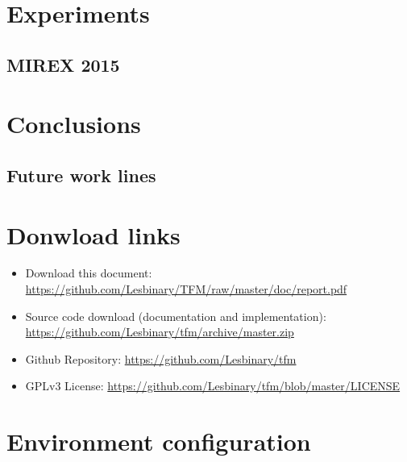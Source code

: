 \documentclass[a4paper,openany,oneside,12pt]{book}
\begin{document}
\chapter{Experiments}\label{experiments}

\section{MIREX 2015}

\chapter{Conclusions}\label{conclusions}



\section{Future work lines}







\nocite{*}
\cleardoublepage
{}








\appendix
\chapter{Donwload links}\label{links}
\begin{itemize}

\item Download this document: \url{https://github.com/Lesbinary/TFM/raw/master/doc/report.pdf}

\item Source code download (documentation and implementation): \url{https://github.com/Lesbinary/tfm/archive/master.zip}

\item Github Repository: \url{https://github.com/Lesbinary/tfm}

\item GPLv3 License: \url{https://github.com/Lesbinary/tfm/blob/master/LICENSE}

\end{itemize}


\chapter{Environment configuration}\label{configuration}
\end{document}
